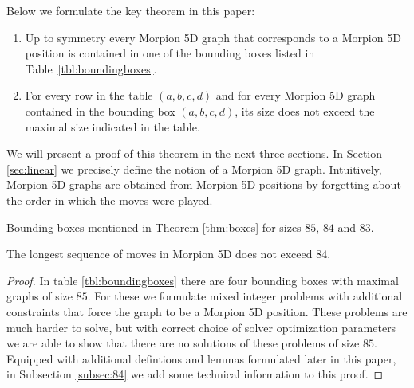   
Below we formulate the key theorem in this paper: %
\begin{theorem}
\begin{enumerate}
\item Up to symmetry every Morpion 5D graph that corresponds to a Morpion 5D position
    is contained in one of the bounding boxes listed in Table~\ref{tbl:boundingboxes}.
\item For every row in the table $(a,b,c,d)$ and for every Morpion 5D graph contained in the bounding box  $(a,b,c,d)$,
its size does not exceed the maximal size indicated in the table.
\end{enumerate} 
\label{thm:boxes}
\end{theorem}
We will present a proof of this theorem in the next three sections. 
In Section \ref{sec:linear} we precisely define the notion of a Morpion 5D graph. Intuitively, Morpion 5D graphs are obtained from Morpion 5D positions by forgetting about the order in which the moves were played.

\begin{table}[ht]
\centering
 

\caption{Bounding boxes mentioned in Theorem \ref{thm:boxes} for sizes $85$, $84$ and $83$. }
\label{tbl:boundingboxes}
\end{table}




\begin{corollary}
\label{cor:84}
The longest sequence of moves in Morpion 5D does not exceed $84$.
\end{corollary}
\begin{proof} 
In table \ref{tbl:boundingboxes} there are four bounding boxes with maximal graphs of size $85$. 
For these we formulate mixed integer problems with additional constraints that force the graph to
  be a Morpion 5D position.
These problems are much harder to solve, but with correct choice of solver optimization parameters we are able to show
  that there are no solutions of these problems of size $85$. Equipped with additional defintions and lemmas formulated later in this paper, in Subsection \ref{subsec:84} we add some technical 
information to this proof. 
\end{proof}


